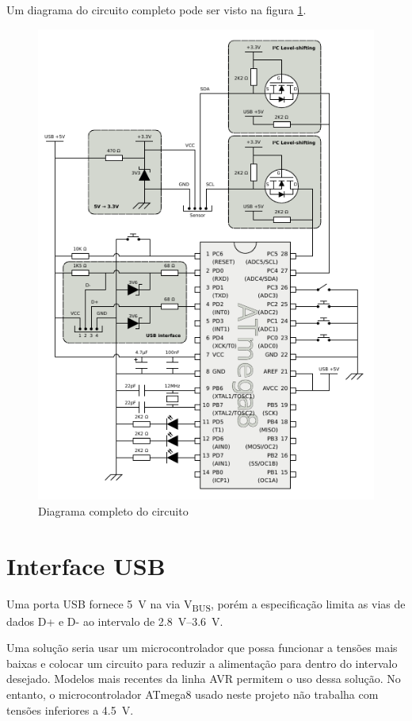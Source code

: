 \documentclass[brazil,pagestart=firstchapter]{abnt}
\newcommand*{\VBUS}{V\textsubscript{BUS}\xspace}
\begin{document}
Um diagrama do circuito completo pode ser visto na figura
\ref{fig:circuito_completo}.

\begin{figure}[h]
\centering
\includegraphics[width=1.0\textwidth]{img/AVR-magnetometer-usb-mouse.pdf}
\caption{Diagrama completo do circuito}
\label{fig:circuito_completo}
\end{figure}


\section{Interface USB}
\label{sec:hardware_usb}

Uma porta \ac{USB} fornece \SI{5}{\volt} na via \VBUS, porém a especificação
limita as vias de dados D+ e D- ao intervalo de \SIrange{2.8}{3.6}{\volt}.
\cite[p.~178,~179]{usb20}

Uma solução seria usar um microcontrolador que possa funcionar a tensões
mais baixas e colocar um circuito para reduzir a alimentação para dentro do
intervalo desejado. Modelos mais recentes da linha AVR permitem o uso dessa
solução. \cite[p.~322]{ATmega_newer_datasheets} No entanto, o
microcontrolador ATmega8 usado neste projeto não trabalha com tensões
inferiores a \SI{4.5}{\volt}. \cite{ATmega8}
\end{document}
